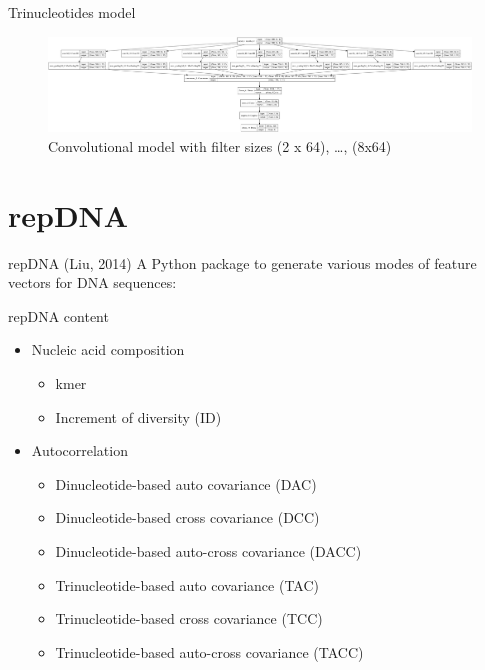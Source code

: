 \documentclass[10pt]{beamer}
\begin{document}
\begin{frame}{Trinucleotides model}
	\begin{figure}[ht]
		\centering
		\includegraphics[width = 1.05\textwidth]{../../models/plotted_models/trint_model_2019-10-08_09-27-12.png}
		\caption{Convolutional model with filter sizes (2 x 64), \dots, (8x64)}
	\end{figure}
\end{frame}

\section{repDNA}
\begin{frame}{repDNA (Liu, 2014)}
	A \glqq Python package to generate various modes of feature vectors for DNA sequences\grqq:
	\begin{block}{repDNA content}
		\begin{itemize}
			\item Nucleic acid composition
			\begin{itemize}
				\item kmer
				\item Increment of diversity (ID)
			\end{itemize}
			\item Autocorrelation
			\begin{itemize}
				\item Dinucleotide-based auto covariance (DAC)
				\item Dinucleotide-based cross covariance (DCC)
				\item Dinucleotide-based auto-cross covariance (DACC)
				\item Trinucleotide-based auto covariance (TAC)
				\item Trinucleotide-based cross covariance (TCC)
				\item Trinucleotide-based auto-cross covariance (TACC)
			\end{itemize}
		\end{itemize}
	\end{block}
\end{frame}
\end{document}

